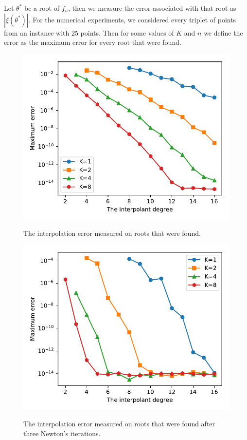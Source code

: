 Let $\theta^*$ be a root of $f_n$, then we measure the error associated with that root as $|\xi(\theta^*)|$. For the numerical experiments, we considered every triplet of points from an instance with $25$ points. Then for some values of $K$ and $n$ we define the error as the maximum error for every root that were found.

\begin{figure}
	\centering
	\caption{The interpolation error measured on roots that were found.}
	\includegraphics{tex/figures/interpolant_error}
	\fautor
	\label{fig:interpolant_error}
\end{figure}

\begin{figure}
	\centering
	\caption{The interpolation error measured on roots that were found after three Newton's iterations.}
	\includegraphics{tex/figures/interpolant_error_after_newton}
	\fautor
	\label{fig:interpolant_error_after_newton}
\end{figure}
